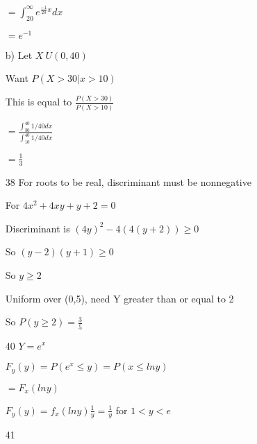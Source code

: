 \documentclass[12pt]{article}
\begin{document}
\begin{itemize}
  $=\int_{20}^{\infty} e^{\frac{-1}{20}x}dx$

  $= e^{-1}$

  b) Let $X ~ U(0, 40)$

  Want $P(X > 30 | x > 10)$

  This is equal to $\frac{P(X > 30)}{P(X > 10)}$

  $= \frac{   \int_{30}^{40} 1/40 dx} { \int_{10}^{40} 1/40 dx} $

  $= \frac{1}{3}$
\item[38]
  For roots to be real, discriminant must be nonnegative

  For $4x^2 + 4xy + y + 2 = 0$

  Discriminant is $(4y)^2 - 4(4(y + 2)) \geq 0$

  So $(y - 2)(y + 1) \geq 0$

  So $y \geq 2$

  Uniform over (0,5), need Y greater than or equal to 2

  So $P(y \geq 2) = \frac{3}{5}$
\item[40]
  $Y = e^x$

  $F_y (y) = P(e^x \leq y) = P(x \leq ln y)$

  $=F_x(ln y)$

  $F_y (y) = f_x (lny) \frac{1}{y} = \frac{1}{y}$ for $1 < y < e$
\item[41]
\end{itemize}
\end{document}
